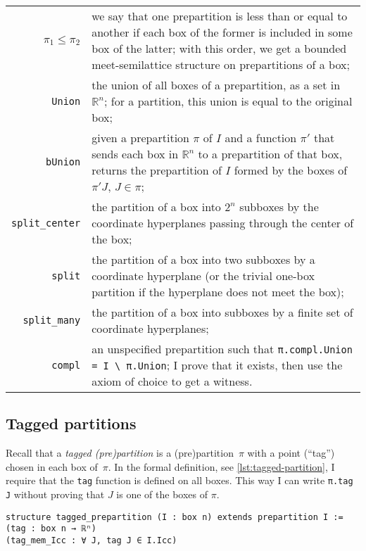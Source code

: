 \documentclass[a4paper, UKenglish,cleveref, autoref, thm-restate]{lipics-v2021}
\newcommand{\bbR}{\mathbb{R}}
\begin{document}
\noindent%
\begin{tabular}{rp{10cm}}
  \(\pi_{1}\le\pi_{2}\)&we say that one prepartition is less than or equal to another if each box of the former is included in some box of the latter; with this order, we get a bounded meet-semilattice structure on prepartitions of a box;\\
  \lstinline=Union=&the union of all boxes of a prepartition, as a set in \(\bbR^{n}\); for a partition, this union is equal to the original box;\\
  \lstinline=bUnion=&given a prepartition \(\pi\) of \(I\) and a function \(\pi'\) that sends each box in \(\bbR^{n}\) to a prepartition of that box, returns the prepartition of \(I\) formed by the boxes of \(\pi' J\), \(J \in \pi\);\\
  \lstinline=split_center=&the partition of a box into \(2^{n}\) subboxes by the coordinate hyperplanes passing through the center of the box;\\
  \lstinline=split=&the partition of a box into two subboxes by a coordinate hyperplane (or the trivial one-box partition if the hyperplane does not meet the box);\\
  \lstinline=split_many=&the partition of a box into subboxes by a finite set of coordinate hyperplanes;\\
  \lstinline=compl=&an unspecified prepartition such that \lstinline~π.compl.Union = I \ π.Union~; I prove that it exists, then use the axiom of choice to get a witness.
\end{tabular}

\subsection{Tagged partitions}%
\label{sec:tagged-partitions}

Recall that a \emph{tagged (pre)partition} is a (pre)partition~\(\pi\)
with a point (\enquote{tag}) chosen in each box of~\(\pi\). In the
formal definition, see \autoref{lst:tagged-partition}, I require that
the \lstinline=tag= function is defined on all boxes. This way I can
write \lstinline=π.tag J= without proving that \(J\) is one of the
boxes of \(\pi\).

\begin{lstlisting}[caption={Definition of a tagged (pre)partition}, label=lst:tagged-partition]
structure tagged_prepartition (I : box n) extends prepartition I :=
(tag : box n → ℝⁿ)
(tag_mem_Icc : ∀ J, tag J ∈ I.Icc)
\end{lstlisting}
\end{document}
